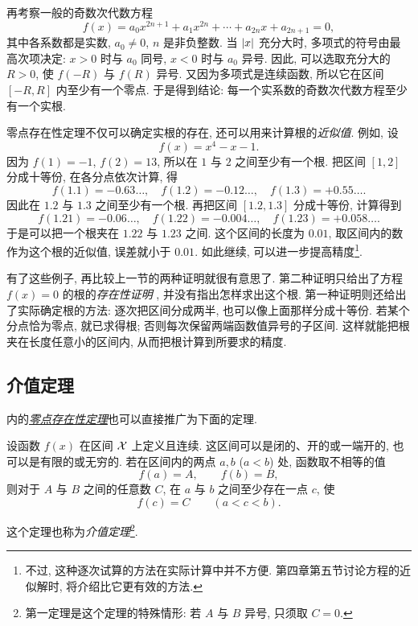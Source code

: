再考察一般的奇数次代数方程
$$
f(x)=a_0x^{2n+1}+a_1x^{2n}+\cdots+a_{2n}x+a_{2n+1}=0,
$$
其中各系数都是实数, $a_0\neq0$, $n$ 是非负整数.
当 $\left| x \right|$ 充分大时, 多项式的符号由最高次项决定:
$x>0$ 时与 $a_0$ 同号, $x<0$ 时与 $a_0$ 异号.
因此, 可以选取充分大的 $R>0$, 使 $f(-R)$ 与 $f(R)$ 异号.
又因为多项式是连续函数, 所以它在区间 $[-R,R]$ 内至少有一个零点.
于是得到结论:
{\kaishu 每一个实系数的奇数次代数方程至少有一个实根.}

零点存在性定理不仅可以确定实根的存在, 还可以用来计算根的\emph{近似值}.
例如, 设
$$
f(x)=x^4-x-1.
$$
因为 $f(1)=-1$, $f(2)=13$, 所以在 $1$ 与 $2$ 之间至少有一个根.
把区间 $[1,2]$ 分成十等份, 在各分点依次计算, 得
$$
f(1.1)=-0.63\ldots,\quad
f(1.2)=-0.12\ldots,\quad
f(1.3)=+0.55\ldots.
$$
因此在 $1.2$ 与 $1.3$ 之间至少有一个根.
再把区间 $[1.2,1.3]$ 分成十等份, 计算得到
$$
f(1.21)=-0.06\ldots,\quad
f(1.22)=-0.004\ldots,\quad
f(1.23)=+0.058\ldots.
$$
于是可以把一个根夹在 $1.22$ 与 $1.23$ 之间.
这个区间的长度为 $0.01$, 取区间内的数作为这个根的近似值, 误差就小于 $0.01$.
如此继续, 可以进一步提高精度\footnote{不过, 这种逐次试算的方法在实际计算中并不方便.
第四章第五节讨论方程的近似解时, 将介绍比它更有效的方法.}.

有了这些例子, 再比较上一节的两种证明就很有意思了.
第二种证明只给出了方程 $f(x)=0$ 的根的\emph{存在性证明}
, 并没有指出怎样求出这个根.
第一种证明则还给出了实际确定根的方法: 逐次把区间分成两半,
也可以像上面那样分成十等份.
若某个分点恰为零点, 就已求得根; 否则每次保留两端函数值异号的子区间.
这样就能把根夹在长度任意小的区间内, 从而把根计算到所要求的精度.

\subsection{介值定理}\label{subsec:82}
 内的\hyperref[thm:bolzano_cauchy_zero]{\emph{零点存在性定理}}也可以直接推广为下面的定理.

\begin{namedtheorem}\label{thm:bolzano_cauchy_intermediate_value}
设函数 $f(x)$ 在区间 $\mathcal{X}$ 上定义且连续.
这区间可以是闭的、开的或一端开的, 也可以是有限的或无穷的.
若在区间内的两点 $a,b$ ($a<b$) 处, 函数取不相等的值
$$
f(a)=A,\qquad f(b)=B,
$$
则对于 $A$ 与 $B$ 之间的任意数 $C$, 在 $a$ 与 $b$ 之间至少存在一点 $c$, 使
$$
f(c)=C\qquad(a<c<b).
$$
\end{namedtheorem}
这个定理也称为\emph{介值定理}\footnote{第一定理是这个定理的特殊情形: 若 $A$ 与 $B$ 异号, 只须取 $C=0$.}.

